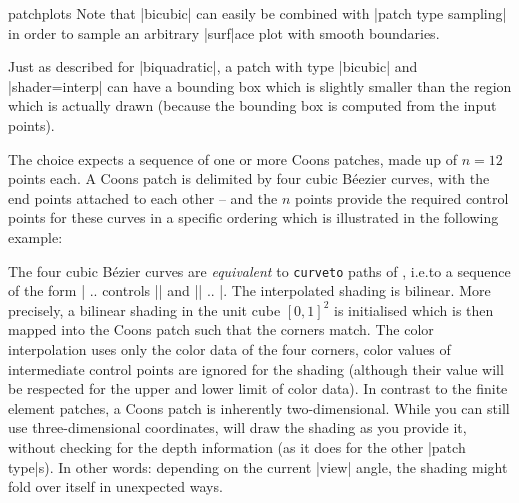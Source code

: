 {\begin{pgfplotslibrary}{patchplots}
Note that |bicubic| can easily be combined with |patch type sampling| in order
to sample an arbitrary |surf|ace plot with smooth boundaries.

Just as described for |biquadratic|, a patch with type |bicubic| and
|shader=interp| can have a bounding box which is slightly smaller than the
region which is actually drawn (because the bounding box is computed from the
input points).

The choice  expects a sequence of one or more Coons
patches, made up of $n=12$ points each. A Coons patch is delimited by four
cubic Béezier curves, with the end points attached to each other -- and the $n$
points provide the required control points for these curves in a specific
ordering which is illustrated in the following example:
%
\begin{codeexample}[]
\end{codeexample}
%
\noindent The four cubic Bézier curves are \emph{equivalent} to
\texttt{curveto} paths of \pgfname{}, i.e.\@ to a sequence of the form
| .. controls || and || .. |.
The interpolated shading is bilinear. More precisely, a bilinear shading in the
unit cube $[0,1]^2$ is initialised which is then mapped into the Coons patch
such that the corners match. The color interpolation uses only the color data
of the four corners, color values of intermediate control points are ignored
for the shading (although their value will be respected for the upper and lower
limit of color data). In contrast to the finite element patches, a Coons patch
is inherently two-dimensional. While you can still use three-dimensional
coordinates, \PGFPlots{} will draw the shading as you provide it, without
checking for the depth information (as it does for the other |patch type|s). In
other words: depending on the current |view| angle, the shading might fold over
itself in unexpected ways.


\end{pgfplotslibrary}}
